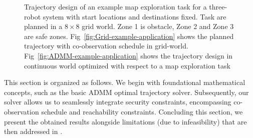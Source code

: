 \documentclass[journal]{IEEEtran}  %
\begin{document}
\begin{figure}
     \centering
     \caption{Trajectory design of an example map exploration task for a three-robot system with start locations and destinations fixed. Task are planned in a $8 \times 8$ grid world. Zone 1 is obstacle, Zone 2 and Zone 3 are safe zones. Fig~\ref{fig:Grid-example-application} shows the planned trajectory with co-observation schedule in grid-world. Fig~\ref{fig:ADMM-example-application} shows the trajectory design in continuous world optimized with respect to a map exploration task}
     \label{fig:example-application}
 \end{figure}
 
 This section is organized as follows. We begin with foundational mathematical concepts, such as the basic ADMM optimal trajectory solver. Subsequently, our solver allows us to seamlessly integrate security constraints, encompassing co-observation schedule and reachability constraints. Concluding this section, we present the obtained results alongside limitations (due to infeasibility) that are then addressed in .
\end{document}
